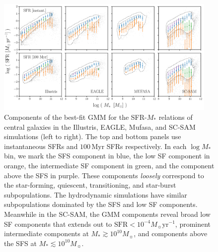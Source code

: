 \documentclass[tighten, preprint]{aastex62}
\begin{document}
\begin{figure}
\begin{center}
\includegraphics[width=0.95\textwidth]{Catalogs_GMMcomps.pdf} 
\caption{Components of the best-fit GMM for the SFR-$M_*$ relations of central 
    galaxies in the Illustris, EAGLE, {\sc Mufasa}, and 
    SC-SAM simulations (left to right). The top and bottom panels use instantaneous 
    SFRs and $100\,\mathrm{Myr}$ SFRs respectively. In each $\log M_*$ bin, we mark 
    the SFS component in blue, the low SF component in orange, the intermediate SF 
    component in green, and the component above the SFS in purple. These components 
    \emph{loosely} correspond to the star-forming, quiescent, transitioning, and 
    star-burst subpopulations. The hydrodynamic simulations have similar 
    subpopulations dominated by the SFS and low SF components. Meanwhile in the 
    SC-SAM, the GMM components reveal broad low SF components that extends out to 
    $\mathrm{SFR} < 10^{-4}M_\sun \mathrm{yr}^{-1}$, prominent intermediate components at 
    $M_* \gtrsim 10^{10}M_\sun$, and components above the SFS at $M_* \lesssim 10^{10}M_\sun$.} \label{fig:sfmsfit_comps}
\end{center}
\end{figure}
\end{document}
